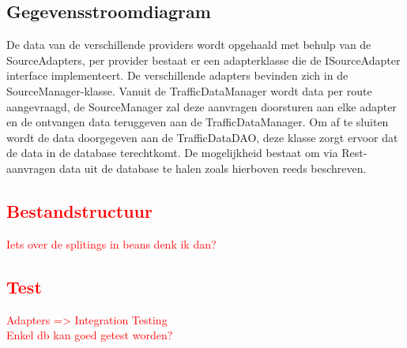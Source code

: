 \documentclass[ps,a4paper,oneside]{report}
\begin{document}
\subsection{Gegevensstroomdiagram}
De data van de verschillende providers wordt opgehaald met behulp van de SourceAdapters, per provider bestaat er een adapterklasse die de ISourceAdapter interface implementeert. De verschillende adapters bevinden zich in de \\SourceManager-klasse. Vanuit de TrafficDataManager wordt data per route aangevraagd, de SourceManager zal deze aanvragen doorsturen aan elke adapter en de ontvangen data teruggeven aan de TrafficDataManager. Om af te sluiten wordt de data doorgegeven aan de TrafficDataDAO, deze klasse zorgt ervoor dat de data in de database terechtkomt. De mogelijkheid bestaat om via Rest-aanvragen data uit de database te halen zoals hierboven reeds beschreven.
\textcolor{red}{\subsection{Bestandstructuur}
Iets over de splitings in beans denk ik dan?
\subsection{Test}
Adapters => Integration Testing\\
Enkel db kan goed getest worden?
}
\end{document}
